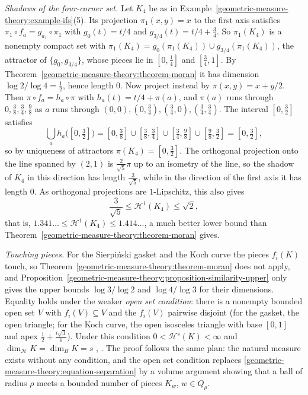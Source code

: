 \begin{example}\label{geometric-measure-theory:example-four-corner-projections}
\emph{Shadows of the four-corner set.} Let $K_4$ be as in Example~\ref{geometric-measure-theory:example-ifs}(5). Its projection $\pi_1(x, y) = x$ to the first axis satisfies $\pi_1 \circ f_a = g_{a_1} \circ \pi_1$ with
$g_0(t) = t/4$ and $g_{3/4}(t) = t/4 + \frac34$. So $\pi_1(K_4)$ is a nonempty compact set with $\pi_1(K_4) = g_0(\pi_1(K_4)) \cup g_{3/4}(\pi_1(K_4))$, the attractor of $\{g_0, g_{3/4}\}$, whose pieces lie in
$[0, \frac14]$ and $[\frac34, 1]$. By Theorem~\ref{geometric-measure-theory:theorem-moran} it has dimension $\log 2/\log 4 = \frac12$, hence length $0$. Now project instead by $\pi(x, y) = x + y/2$. Then
$\pi \circ f_a = h_a \circ \pi$ with $h_a(t) = t/4 + \pi(a)$, and $\pi(a)$ runs through $0, \frac38, \frac34, \frac98$ as $a$ runs through $(0, 0), (0, \frac34), (\frac34, 0), (\frac34, \frac34)$. The interval
$[0, \frac32]$ satisfies
\[
\bigcup_ah_a\bigl([0, \tfrac32]\bigr) = [0, \tfrac38] \cup [\tfrac38, \tfrac34] \cup [\tfrac34, \tfrac98] \cup [\tfrac98, \tfrac32] = [0, \tfrac32],
\]
so by uniqueness of attractors $\pi(K_4) = [0, \frac32]$. The orthogonal projection onto the line spanned by $(2, 1)$ is $\frac{2}{\sqrt5}\pi$ up to an isometry of the line, so the shadow of $K_4$ in this
direction has length $\frac{3}{\sqrt5}$, while in the direction of the first axis it has length $0$. As orthogonal projections are $1$-Lipschitz, this also gives
\[
\frac{3}{\sqrt5} \leq \mathcal{H}^1(K_4) \leq \sqrt2,
\]
that is, $1.341\ldots \leq \mathcal{H}^1(K_4) \leq 1.414\ldots$, a much better lower bound than Theorem~\ref{geometric-measure-theory:theorem-moran} gives.
\end{example}

\begin{remark}\label{geometric-measure-theory:remark-open-set-condition}
\emph{Touching pieces.} For the Sierpi\'nski gasket and the Koch curve the pieces $f_i(K)$ touch, so Theorem~\ref{geometric-measure-theory:theorem-moran} does not apply, and
Proposition~\ref{geometric-measure-theory:proposition-similarity-upper} only gives the upper bounds $\log 3/\log 2$ and $\log 4/\log 3$ for their dimensions. Equality holds under
the weaker \emph{open set condition}: there is a nonempty bounded open set $V$ with $f_i(V) \subseteq V$ and the $f_i(V)$ pairwise disjoint (for the gasket, the open triangle; for the Koch curve, the
open isosceles triangle with base $[0, 1]$ and apex $\frac12 + \frac{i\sqrt3}{6}$). Under this condition $0 < \mathcal{H}^s(K) < \infty$ and $\dim_{\mathcal{H}}K = \dim_BK = s$
\cite{hutchinson-1981}, \cite[Chapter 9]{falconer-fractal}. The proof follows the same plan: the natural measure exists without any condition, and the open set condition replaces
\eqref{geometric-measure-theory:equation-separation} by a volume argument showing that a ball of radius $\rho$ meets a bounded number of pieces $K_w$, $w \in Q_\rho$.
\end{remark}

